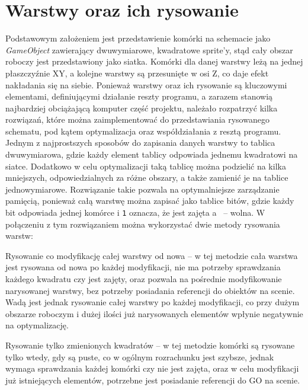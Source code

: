 \section{Warstwy oraz ich rysowanie}
\label{sec:warstwy_oraz_ich_rysowanie}

Podstawowym założeniem jest przedstawienie komórki na schemacie jako \textit{GameObject} zawierający dwuwymiarowe,
kwadratowe sprite'y,
stąd cały obszar roboczy jest przedstawiony jako siatka.
Komórki dla danej warstwy leżą na jednej płaszczyźnie XY, a kolejne warstwy są przesunięte w osi Z,
co daje efekt nakładania się na siebie.
Ponieważ warstwy oraz ich rysowanie są kluczowymi elementami, definiującymi działanie reszty programu,
a zarazem stanowią najbardziej obciążającą komputer część projektu,
należało rozpatrzyć kilka rozwiązań, które można zaimplementować do przedstawiania rysowanego schematu,
pod kątem optymalizacja oraz współdziałania z resztą programu.\\
\indent Jednym z najprostszych sposobów do zapisania danych warstwy to tablica dwuwymiarowa,
gdzie każdy element tablicy odpowiada jednemu kwadratowi na siatce.
Dodatkowo w celu optymalizacji taką tablicę można podzielić na kilka mniejszych,
odpowiedzialnych za różne obszary, a także zamienić je na tablice jednowymiarowe.
Rozwiązanie takie pozwala na optymalniejsze zarządzanie pamięcią,
ponieważ całą warstwę można zapisać jako tablice bitów,
gdzie każdy bit odpowiada jednej komórce i \texttt{1} oznacza,
że jest zajęta a~ -- wolna.
W połączeniu z tym rozwiązaniem można wykorzystać dwie metody rysowania warstw:

\begin{citemize}
    \item Rysowanie co modyfikację całej warstwy od nowa -- w tej metodzie cała warstwa jest rysowana od nowa po każdej modyfikacji,
    nie ma potrzeby sprawdzania każdego kwadratu czy jest zajęty, oraz pozwala na pośrednie modyfikowanie narysowanej warstwy,
    bez potrzeby posiadania referencji do obiektów na scenie.
    Wadą jest jednak rysowanie całej warstwy po każdej modyfikacji,
    co przy dużym obszarze roboczym i dużej ilości już narysowanych elementów wpłynie negatywnie na optymalizację.
    \item Rysowanie tylko zmienionych kwadratów -- w tej metodzie komórki są rysowane tylko wtedy, gdy są puste,
    co w ogólnym rozrachunku jest szybsze, jednak wymaga sprawdzania każdej komórki czy nie jest zajęta,
    oraz w celu modyfikacji już istniejących elementów, potrzebne jest posiadanie referencji do GO na scenie.
\end{citemize}

